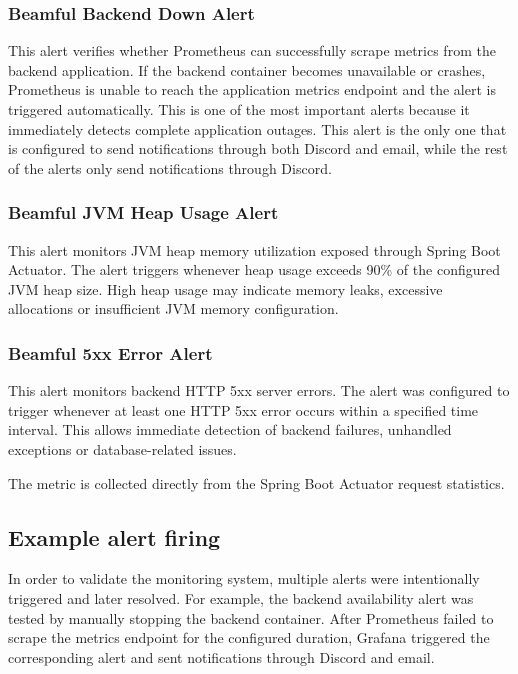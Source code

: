 \documentclass[11pt,a4paper]{article}
\begin{document}
\subsubsection{Beamful Backend Down Alert}

This alert verifies whether Prometheus can successfully scrape metrics from the backend application. If the backend container 
becomes unavailable or crashes, Prometheus is unable to reach the application metrics endpoint and the alert is triggered 
automatically. This is one of the most important alerts because it immediately detects complete application outages. This
alert is the only one that is configured to send notifications through both Discord and email, while the rest of the alerts 
only send notifications through Discord.

\subsubsection{Beamful JVM Heap Usage Alert}

This alert monitors JVM heap memory utilization exposed through Spring Boot Actuator. The alert triggers whenever heap 
usage exceeds 90\% of the configured JVM heap size. High heap usage may indicate memory leaks, excessive allocations or 
insufficient JVM memory configuration.

\subsubsection{Beamful 5xx Error Alert}

This alert monitors backend HTTP 5xx server errors. The alert was configured to trigger whenever at least one 
HTTP 5xx error occurs within a specified time interval. This allows immediate detection of backend failures, unhandled 
exceptions or database-related issues.

The metric is collected directly from the Spring Boot Actuator request statistics.

\subsection{Example alert firing}

In order to validate the monitoring system, multiple alerts were intentionally triggered and later resolved. For example, the backend 
availability alert was tested by manually stopping the backend container. After Prometheus failed 
to scrape the metrics endpoint for the configured duration, Grafana triggered the corresponding alert and sent notifications 
through Discord and email.
\end{document}
